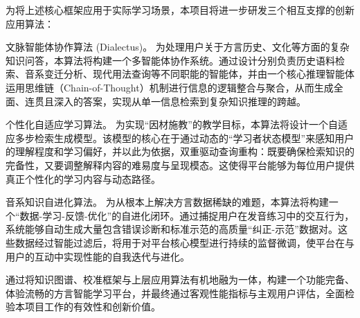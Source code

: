 为将上述核心框架应用于实际学习场景，本项目将进一步研发三个相互支撑的创新应用算法：

文脉智能体协作算法 (Dialectus)。 为处理用户关于方言历史、文化等方面的复杂知识问答，本算法将构建一个多智能体协作系统。通过设计分别负责历史语料检索、音系变迁分析、现代用法查询等不同职能的智能体，并由一个核心推理智能体运用思维链（Chain-of-Thought）机制进行信息的逻辑整合与聚合，从而生成全面、连贯且深入的答案，实现从单一信息检索到复杂知识推理的跨越。

个性化自适应学习算法。 为实现“因材施教”的教学目标，本算法将设计一个自适应多步检索生成模型。该模型的核心在于通过动态的“学习者状态模型”来感知用户的理解程度和学习偏好，并以此为依据，双重驱动查询重构：既要确保检索知识的完备性，又要调整解释内容的难易度与呈现模态。这使得平台能够为每位用户提供真正个性化的学习内容与动态路径。

音系知识自进化算法。 为从根本上解决方言数据稀缺的难题，本算法将构建一个“数据-学习-反馈-优化”的自进化闭环。通过捕捉用户在发音练习中的交互行为，系统能够自动生成大量包含错误诊断和标准示范的高质量“纠正-示范”数据对。这些数据经过智能过滤后，将用于对平台核心模型进行持续的监督微调，使平台在与用户的互动中实现性能的自我迭代与进化。

通过将知识图谱、校准框架与上层应用算法有机地融为一体，构建一个功能完备、体验流畅的方言智能学习平台，并最终通过客观性能指标与主观用户评估，全面检验本项目工作的有效性和创新价值。